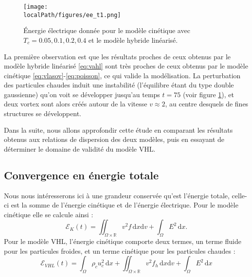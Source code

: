 \begin{figure}[h]
  \centering
  \texttt{[image: \\localPath/figures/ee\_t1.png]}
  \caption{Énergie électrique donnée pour le modèle cinétique avec $T_c=0.05,0.1,0.2,0.4$ et le modèle hybride linéarisé.}
  \label{fig:limit_ee_Tf300}
\end{figure}
La première observation est que les résultats proches de ceux obtenus par le modèle hybride linéarisé \eqref{eq:vahl} sont très proches de ceux obtenus par le modèle cinétique \eqref{eq:vlasov}-\eqref{eq:poisson}, ce qui valide la modélisation. La perturbation des particules chaudes induit une instabilité (l'équilibre étant du type double gaussienne) qu'on voit se développer jusqu'au temps $t=75$ (voir figure \ref{fig:limit_ee_Tf300}), et deux vortex sont alors créés autour de la vitesse $v\approx 2$, au centre desquels de fines structures se développent. 

Dans la suite, nous allons approfondir cette étude en comparant les résultats obtenus aux relations de dispersion des deux modèles, puis en essayant de déterminer le domaine de validité du modèle VHL.  


\FloatBarrier
\subsection{Convergence en énergie totale}

Nous nous intéresserons ici à une grandeur conservée qu'est l'énergie totale, celle-ci est la somme de l'énergie cinétique et de l'énergie électrique. Pour le modèle cinétique elle se calcule ainsi :
$$
  \mathcal{E}_K(t) = \iint_{\Omega\times\mathbb{R}} v^2 f\,\mathrm{d}x\mathrm{d}v + \int_{\Omega} E^2\,\mathrm{d}x. 
$$
Pour le modèle VHL, l'énergie cinétique comporte deux termes, un terme fluide pour les particules froides, et un terme cinétique pour les particules chaudes :
$$
  \mathcal{E}_{VHL}(t) = \int_\Omega \rho_c u_c^2\,\mathrm{d}x + \iint_{\Omega\times\mathbb{R}}v^2f_h\,\mathrm{d}x\mathrm{d}v + \int_\Omega E^2\,\mathrm{d}x
$$

